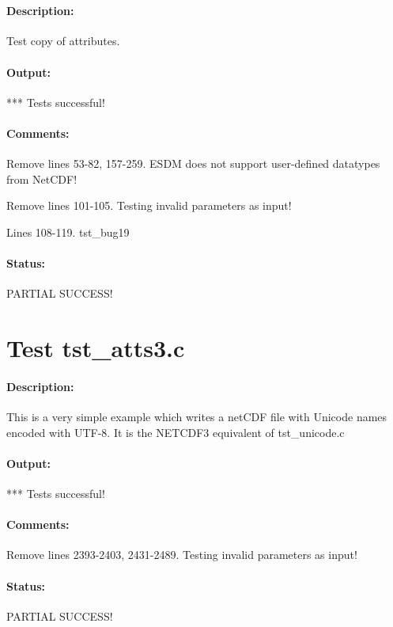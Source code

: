 \section{{\color{blue}{FIX ME! Test tst\_atts2.c!}}}

\paragraph{Description:} Test copy of attributes.

\paragraph{Output:} *** Tests successful!

\paragraph{Comments:} Remove lines 53-82, 157-259. ESDM does not support user-defined datatypes from NetCDF!

Remove lines 101-105. Testing invalid parameters as input!

Lines 108-119. tst\_bug19

\paragraph{Status:} PARTIAL SUCCESS!

\section{Test tst\_atts3.c}

\paragraph{Description:} This is a very simple example which writes a netCDF file with Unicode names encoded with UTF-8. It is the NETCDF3 equivalent of tst\_unicode.c

\paragraph{Output:} *** Tests successful!

\paragraph{Comments:} Remove lines 2393-2403, 2431-2489. Testing invalid parameters as input!

\paragraph{Status:} PARTIAL SUCCESS!


